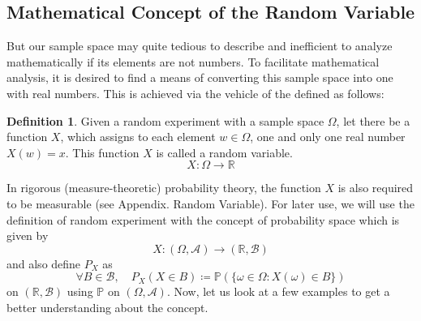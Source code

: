 \documentclass[twoside]{article}
\theoremstyle{definition}
\newtheorem{definition}{Definition}[section]
\theoremstyle{remark}
\theoremstyle{remark}
\begin{document}
\subsection{Mathematical Concept of the Random Variable}
But our sample space may quite tedious to describe and inefficient to analyze
mathematically if its elements are not numbers. To facilitate mathematical analysis,
it is desired to find a means of converting this sample space into one with real
numbers. This is achieved via the vehicle of the 
defined as follows:

\begin{definition}
  Given a random experiment with a sample space $\Omega$, let there be a function
  $X$, which assigns to each element $w \in \Omega$, one and only one real number
  $X(w) = x$. This function $X$ is called a random variable.
  \begin{equation}
    X: \Omega \rightarrow \mathbb{R}
  \end{equation}
\end{definition}
In rigorous (measure-theoretic) probability theory, the function $X$ is also
required to be measurable (see Appendix. Random Variable). For later use,
we will use the definition of random experiment with the concept of probability
space which is given by
\begin{equation*}
  X: (\Omega, \mathcal{A}) \rightarrow (\mathbb{R}, \mathcal{B})
\end{equation*}
and also define $P_X$ as
\begin{equation*}
  \forall B \in \mathcal{B},\quad P_X(X \in B) \coloneqq \mathbb{P}(\{\omega \in \Omega : X(\omega) \in B\})
\end{equation*}
on $(\mathbb{R}, \mathcal{B})$ using $\mathbb{P}$ on $(\Omega, \mathcal{A})$. Now,
let us look at a few examples to get a better understanding about the concept.
\end{document}
